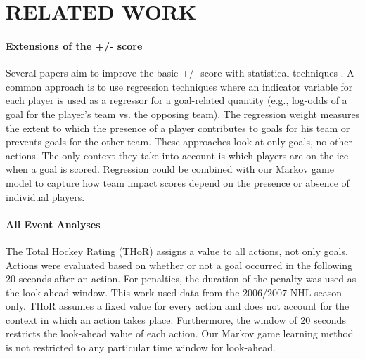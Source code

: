 
\section{RELATED WORK}
\label{sec:related-work}








\paragraph{Extensions of the +/- score} Several papers aim to improve the basic +/- score with statistical techniques \citep{Macdonald2011a,Gramacy2013,Spagnola2013}. A common approach is to use regression techniques where an indicator variable for each player is used as a regressor for a goal-related quantity (e.g., log-odds of a goal for the player's team vs. the opposing team). The regression weight measures the extent to which the presence of a player contributes to goals for his team or prevents goals for the other team. These approaches look at only goals, no other actions. The only context they take into account is which players are on the ice when a goal is scored. Regression could be combined with our Markov game model to capture how team impact scores depend on the presence or absence of individual players.

\paragraph{All Event Analyses} 
The Total Hockey Rating (THoR) \citep{Schuckers2013} assigns a value to all actions, not only goals. Actions were evaluated based on whether or not a goal occurred in the following $20$ seconds after an action. For penalties, the duration of the penalty was used as the look-ahead window.
This work used data from the $2006/2007$ NHL season only. THoR assumes a fixed value for every action and does not account for the context in which an action takes place. Furthermore, the window of $20$ seconds restricts the look-ahead value of each action. Our Markov game learning method is not restricted to any particular time window for look-ahead.

